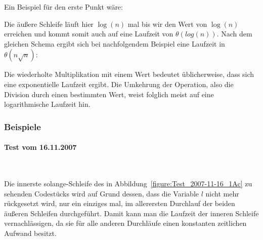 \documentclass[a4paper, 12pt]{article}
\newcommand{\codeinput}[1]
{
    \begin{leftbar}
        
    \end{leftbar}
}
\begin{document}
Ein Beispiel für den erste Punkt wäre:

\codeinput{Add_Constant}

Die äußere Schleife läuft hier $\log\left(n\right)$ mal bis wir den Wert von
$\log\left(n\right)$ erreichen und kommt somit auch auf eine Laufzeit von $θ
\left(log\left(n\right)\right)$. Nach dem gleichen Schema ergibt sich bei
nachfolgendem Beispiel eine Laufzeit in $θ \left(n \sqrt n \right)$:

\codeinput{Subtract}

Die wiederholte Multiplikation mit einem Wert bedeutet üblicherweise, dass
sich eine exponentielle Laufzeit ergibt. Die Umkehrung der Operation, also die
Division durch einen bestimmten Wert, weist folglich meist auf eine
logarithmische Laufzeit hin.

\subsubsection{Beispiele}

\paragraph{Test vom 16.11.2007}~\\
\label{section:Test_2007-11-16}

Die innerste solange-Schleife des in
Abbildung~\ref{figure:Test_2007-11-16_1Ac} zu sehenden Codestücks wird auf
Grund dessen, dass die Variable $l$ nicht mehr rückgesetzt wird, nur ein
einziges mal, im allerersten Durchlauf der beiden äußeren Schleifen
durchgeführt. Damit kann man die Laufzeit der inneren Schleife
vernachlässigen, da sie für alle anderen Durchläufe einen konstanten
zeitlichen Aufwand besitzt.
\end{document}
